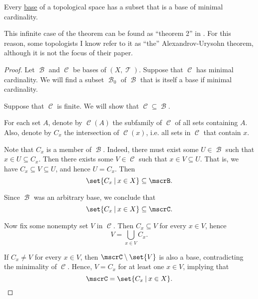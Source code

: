 \begin{proposition}\label{thm:base_has_subset_of_minimal_weight}
  Every \hyperref[def:topological_base]{base} of a topological space has a subset that is a base of minimal cardinality.
\end{proposition}
\begin{comments}
  \item This infinite case of the theorem can be found as \enquote{theorem 2} in \cite{АлександровУрысон1950}. For this reason, some topologists I know refer to it as \enquote{the} Alexandrov-Urysohn theorem, although it is not the focus of their paper.
\end{comments}
\begin{proof}
  Let \( \mscrB \) and \( \mscrC \) be bases of \( (X, \mscrT) \). Suppose that \( \mscrC \) has minimal cardinality. We will find a subset \( \mscrB_0 \) of \( \mscrB \) that is itself a base if minimal cardinality.

   Suppose that \( \mscrC \) is finite. We will show that \( \mscrC \subseteq \mscrB \).

  For each set \( A \), denote by \( \mscrC(A) \) the subfamily of \( \mscrC \) of all sets containing \( A \). Also, denote by \( C_x \) the intersection of \( \mscrC(x) \), i.e. all sets in \( \mscrC \) that contain \( x \).

  Note that \( C_x \) is a member of \( \mscrB \). Indeed, there must exist some \( U \in \mscrB \) such that \( x \in U \subseteq C_x \). Then there exists some \( V \in \mscrC \) such that \( x \in V \subseteq U \). That is, we have \( C_x \subseteq V \subseteq U \), and hence \( U = C_x \). Then
  \begin{equation*}
    \set{ C_x \given x \in X } \subseteq \mscrB.
  \end{equation*}

  Since \( \mscrB \) was an arbitrary base, we conclude that
  \begin{equation*}
    \set{ C_x \given x \in X } \subseteq \mscrC.
  \end{equation*}

  Now fix some nonempty set \( V \) in \( \mscrC \). Then \( C_x \subseteq V \) for every \( x \in V \), hence
  \begin{equation*}
    V = \bigcup_{x \in V} C_x.
  \end{equation*}

  If \( C_x \neq V \) for every \( x \in V \), then \( \mscrC \setminus \set{ V } \) is also a base, contradicting the minimality of \( \mscrC \). Hence, \( V = C_x \) for at least one \( x \in V \), implying that
  \begin{equation*}
    \mscrC = \set{ C_x \given x \in X }.
  \end{equation*}


\end{proof}
